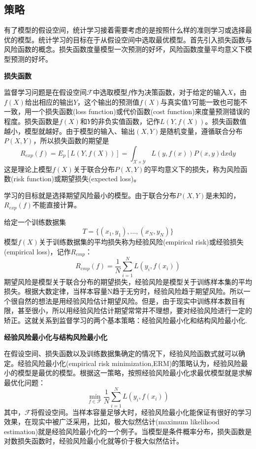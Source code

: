 \subsection*{策略}
有了模型的假设空间，统计学习接着需要考虑的是按照什么样的准则学习或选择最优的模型。统计学习的目标在于从假设空间中选取最优模型。首先引入损失函数与风险函数的概念。损失函数度量模型一次预测的好坏，风险函数度量平均意义下模型预测的好坏。

\textbf{损失函数}

监督学习问题是在假设空间$\mathcal{F}$中选取模型$f$作为决策函数，对于给定的输入$X$，由$f(X)$给出相应的输出$Y$，这个输出的预测值$f(X)$与真实值$Y$可能一致也可能不一致，用一个损失函数(loss function)或代价函数(cost function)来度量预测错误的程度。损失函数是$f(X)$和$Y$的非负实值函数，记作$L(Y,f(X))$。损失函数值越小，模型就越好。由于模型的输入、输出$(X,Y)$是随机变量，遵循联合分布$P(X,Y)$，所以损失函数的期望是
\begin{equation}
	R_{exp}(f)=E_p[L(Y,f(X))]=\int_{\mathcal{X\times Y}}L(y,f(x))P(x,y)\mathrm{d}x\mathrm{d}y
\end{equation}
这是理论上模型$f(X)$关于联合分布$P(X,Y)$的平均意义下的损失，称为风险函数(risk function)或期望损失(expected loss)。

学习的目标就是选择期望风险最小的模型。由于联合分布$P(X,Y)$是未知的，$R_{exp}(f)$不能直接计算。

给定一个训练数据集
\begin{equation}
	T=\{(x_1,y_1),\dots,(x_N,y_N)\}
\end{equation}
模型$f(X)$关于训练数据集的平均损失称为经验风险(empirical risk)或经验损失(empirical loss)，记作$R_{emp}$：
\begin{equation}
	R_{emp}(f)=\frac{1}{N}\sum_{i=1}^{N}L(y_i,f(x_i))
\end{equation}
期望风险是模型关于联合分布的期望损失，经验风险是模型关于训练样本集的平均损失。根据大数定律，当样本容量N趋于无穷时，经验风险趋于期望风险。所以一个很自然的想法是用经验风险估计期望风险。但是，由于现实中训练样本数目有限，甚至很小，所以用经验风险估计期望常常并不理想，要对经验风险进行一定的矫正。这就关系到监督学习的两个基本策略：经验风险最小化和结构风险最小化.

\textbf{经验风险最小化与结构风险最小化}

在假设空间、损失函数以及训练数据集确定的情况下，经验风险函数式就可以确定。经验风险最小化(empirical risk minimization,ERM)的策略认为，经验风险最小的模型是最优的模型。根据这一策略，按照经验风险最小化求最优模型就是求解最优化问题：
\begin{equation}
	\min\limits_{f\in \mathcal{F}}\frac{1}{N}\sum_{i=1}^{N}L(y_i,f(x_i))
\end{equation}
其中，$\mathcal{F}$将假设空间。当样本容量足够大时，经验风险最小化能保证有很好的学习效果，在现实中被广泛采用，比如，极大似然估计(maximum likelihood estimation)就是经验风险最小化的一个例子。当模型是条件概率分布，损失函数是对数损失函数时，经验风险最小化就等价于极大似然估计。

